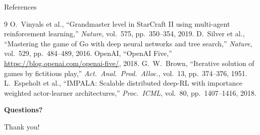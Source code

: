 \documentclass[aspectratio=169]{beamer}
\begin{document}
\begin{frame}{References}
\small
\begin{thebibliography}{9}
 O.~Vinyals et al., ``Grandmaster level in StarCraft II using multi-agent reinforcement learning,'' \textit{Nature}, vol.~575, pp.~350--354, 2019.
 D.~Silver et al., ``Mastering the game of Go with deep neural networks and tree search,'' \textit{Nature}, vol.~529, pp.~484--489, 2016.
 OpenAI, ``OpenAI Five,'' \url{https://blog.openai.com/openai-five/}, 2018.
 G.~W.~Brown, ``Iterative solution of games by fictitious play,'' \textit{Act.\ Anal.\ Prod.\ Alloc.}, vol.~13, pp.~374--376, 1951.
 L.~Espeholt et al., ``IMPALA: Scalable distributed deep-RL with importance weighted actor-learner architectures,'' \textit{Proc.\ ICML}, vol.~80, pp.~1407--1416, 2018.
\end{thebibliography}
\end{frame}

\begin{frame}{}
\centering
\Huge \textbf{Questions?}

\vspace{1em}
\large Thank you!
\end{frame}
\end{document}
